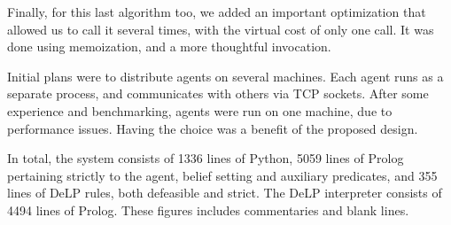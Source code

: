     Finally, for this last algorithm too, we added an important optimization 
    that allowed us to call it several times, with the virtual cost of only one 
    call. It was done using memoization, and a more thoughtful invocation.

    Initial plans were to distribute agents on several machines. Each agent runs 
    as a separate process, and communicates with others via TCP sockets. After 
    some experience and benchmarking, agents were run on one machine, due to 
    performance issues. 
    Having the choice was a benefit of the proposed design.

In total, the system consists of 1336 lines of Python, 5059 lines of Prolog
pertaining strictly to the agent, belief setting and auxiliary predicates, and
355 lines of DeLP rules, both defeasible and strict.  The DeLP interpreter
consists of 4494 lines of Prolog. These figures includes commentaries and blank
lines. 

